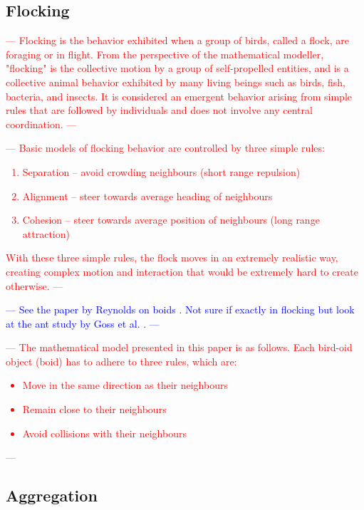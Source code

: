 \subsection{Flocking} \label{subsection:flocking}
\textcolor{red}{---
Flocking is the behavior exhibited when a group of birds, called a flock, are foraging or in flight.
From the perspective of the mathematical modeller, "flocking" is the collective motion by a group of self-propelled entities, 
and is a collective animal behavior exhibited by many living beings such as birds, fish, bacteria, and insects.
It is considered an emergent behavior arising from simple rules that are followed by individuals and does not involve any central coordination.
---}

\textcolor{red}{---
Basic models of flocking behavior are controlled by three simple rules:
\begin{enumerate}
    \item Separation – avoid crowding neighbours (short range repulsion)
    \item Alignment – steer towards average heading of neighbours
    \item Cohesion – steer towards average position of neighbours (long range attraction)
\end{enumerate}
With these three simple rules, the flock moves in an extremely realistic way, 
creating complex motion and interaction that would be extremely hard to create otherwise.
---}

\textcolor{blue}{---
See the paper by Reynolds on boids \cite{reynolds1987flocks}.
Not sure if exactly in flocking but look at the ant study by Goss et al. \cite{goss1989self}.
---}

\textcolor{red}{---
The mathematical model presented in this paper is as follows.
Each bird-oid object (boid) has to adhere to three rules, which are:
\begin{itemize}
    \item Move in the same direction as their neighbours
    \item Remain close to their neighbours
    \item Avoid collisions with their neighbours
\end{itemize}
---}

\subsection{Aggregation} \label{subsection:aggregation}

